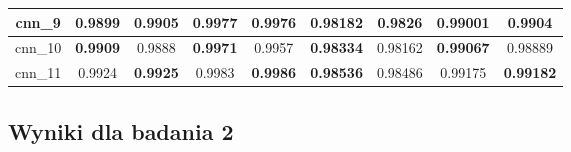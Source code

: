 \begin{table}[p]
\begin{tabular} {|c|c|c|c|c|c|c|c|c| }
        cnn\_9   & 0.9899                              & \textbf{0.9905}                     & \textbf{0.9977}             & 0.9976                              & 0.98182                     & \textbf{0.9826}                      & 0.99001                              & \textbf{0.9904}             \\ \hline
        cnn\_10  & \textbf{0.9909}                     & 0.9888                              & \textbf{0.9971}             & 0.9957                              & \textbf{0.98334}            & 0.98162                              & \textbf{0.99067}                     & 0.98889                     \\ \hline
        cnn\_11  & 0.9924                              & \textbf{0.9925}                     & 0.9983                      & \textbf{0.9986}                     & \textbf{0.98536}            & 0.98486                              & 0.99175                              & \textbf{0.99182}            \\ \hline
    \end{tabular}
\end{table}


\newpage %
\subsection{\label{wyniki_eksperymentow_eks_2}Wyniki dla badania 2}




